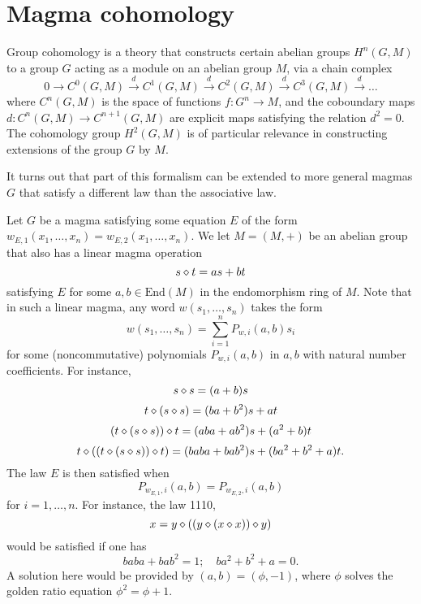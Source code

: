 \chapter{Magma cohomology}\label{cohomology-chapter}

Group cohomology is a theory that constructs certain abelian groups $H^n(G,M)$ to a group $G$ acting as a module on an abelian group $M$, via a chain complex
$$ 0 \to C^0(G,M) \stackrel{d}{\to} C^1(G,M) \stackrel{d}{\to} C^2(G,M) \stackrel{d}{\to} C^3(G,M) \stackrel{d}{\to} \dots$$
where $C^n(G,M)$ is the space of functions $f: G^n \to M$, and the coboundary maps $d: C^n(G,M) \to C^{n+1}(G,M)$ are explicit maps satisfying the relation $d^2=0$.  The cohomology group $H^2(G,M)$ is of particular relevance in constructing extensions of the group $G$ by $M$.

It turns out that part of this formalism can be extended to more general magmas $G$ that satisfy a different law than the associative law.

Let $G$ be a magma satisfying some equation $E$ of the form $w_{E,1}(x_1,\dots,x_n) = w_{E,2}(x_1,\dots,x_n)$.  We let $M = (M,+)$ be an abelian group that also has a linear magma operation
$$ s \diamond t = as + bt$$
satisfying $E$ for some $a,b \in \mathrm{End}(M)$ in the endomorphism ring of $M$.    Note that in such a linear magma, any word $w(s_1,\dots,s_n)$ takes the form
$$ w(s_1,\dots,s_n) = \sum_{i=1}^n P_{w,i}(a,b) s_i$$
for some (noncommutative) polynomials $P_{w,i}(a,b)$ in $a,b$ with natural number coefficients.  For instance,
$$ s \diamond s = (a+b) s$$
$$ t \diamond (s \diamond s) = (ba+b^2) s + at$$
$$ (t \diamond (s \diamond s)) \diamond t = (aba+ab^2) s + (a^2+b)t$$
$$ t \diamond ((t \diamond (s \diamond s)) \diamond t) = (baba+bab^2) s + (ba^2+b^2+a)t.$$
The law $E$ is then satisfied when
$$ P_{w_{E,1},i}(a,b)= P_{w_{E,2},i}(a,b)$$
for $i=1,\dots,n$.  For instance, the law 1110,
\begin{equation}\label{1110}
  x = y \diamond ((y \diamond (x \diamond x)) \diamond y)
\end{equation}
would be satisfied if one has
\begin{equation}\label{baba}
 baba+bab^2 = 1; \quad ba^2+b^2+a = 0.
\end{equation}
A solution here would be provided by $(a,b) = (\phi,-1)$, where $\phi$ solves the golden ratio equation $\phi^2 = \phi + 1$.

